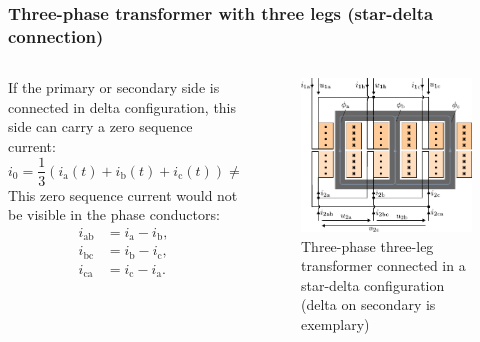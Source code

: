 \begin{frame}
	\frametitle{Three-phase transformer with three legs (star-delta connection)}
	\begin{columns}
		\begin{column}{0.4\textwidth}
 			If the primary or secondary side is connected in delta configuration, this side can carry a zero sequence current:
			\begin{equation*}
				i_0 = \frac{1}{3}\left(i_\mathrm{a}(t) + i_\mathrm{b}(t) + i_\mathrm{c}(t)\right) \neq 0 .
			\end{equation*}
			\pause
			This zero sequence current would not be visible in the phase conductors:
			\begin{equation}
				\begin{split}
					i_\mathrm{ab} &= i_\mathrm{a} - i_\mathrm{b}, \\ i_\mathrm{bc} &= i_\mathrm{b} - i_\mathrm{c},\\ i_\mathrm{ca} &= i_\mathrm{c} - i_\mathrm{a}.
				\end{split}
				\label{eq:zero_sequence_currents_phase_transformer}
			\end{equation}
		\end{column}
        \hfill
		\begin{column}{0.6\textwidth}
			\onslide<1->
			\begin{figure}
				\includegraphics[height=0.7\textheight]{fig/lec04/Three_phase_transformer_3_legs_star_delta.pdf}
				\caption{Three-phase three-leg transformer connected in a star-delta configuration (delta on secondary is exemplary)}
				\label{fig:Three_phase_transformer_3_legs_star_delta}
			\end{figure}
		\end{column}
	\end{columns}
\end{frame}

